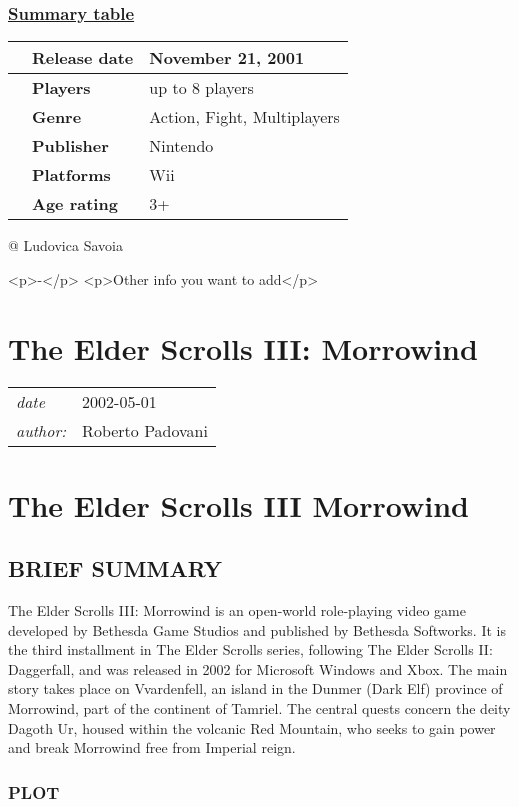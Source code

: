\documentclass[a4paper,10pt]{book}
\newcommand{\pageHeader}[4]{
    \section{#1}
    \vspace{-0.3cm}
    \begin{table}[h!]
     \begin{tabular}{ll}
        \hline
        \textit{date} & #2 \\
        \textit{author: } & #3\\
        \hline
     \end{tabular}
    \end{table}
    \vspace{-0.3cm}
}
\begin{document}
 \subsubsection{\underline{Summary table }}
 \begin{longtable}{p{1mm}|l|l|}\hline
 
 & \textbf{Release date } 
 & November 21, 2001 
 \\\hline
 
 & \textbf{Players } 
 & up to 8 players 
 \\\hline
 
 & \textbf{Genre } 
 & Action, Fight, Multiplayers 
 \\\hline
 
 & \textbf{Publisher } 
 & Nintendo 
 \\\hline
 
 & \textbf{Platforms } 
 & Wii 
 \\\hline
 
 & \textbf{Age rating } 
 & 3+ 
 \\\hline
 \end{longtable}
 
 @ Ludovica Savoia  
 
           <p>-</p>
           <p>Other info you want to add</p>
          
 
 \newpage\pageHeader{The Elder Scrolls III: Morrowind}{2002-05-01}{Roberto Padovani}{Third chapter of the Elder Scrolls}
 \section{ The Elder Scrolls III Morrowind }
 \subsection{BRIEF SUMMARY }
 
          The Elder Scrolls III: Morrowind is an open-world role-playing video game developed by Bethesda Game Studios and published by Bethesda Softworks. It is the third installment in The Elder Scrolls series, following The Elder Scrolls II: Daggerfall, and was released in 2002 for Microsoft Windows and Xbox. The main story takes place on Vvardenfell, an island in the Dunmer (Dark Elf) province of Morrowind, part of the continent of Tamriel. The central quests concern the deity Dagoth Ur, housed within the volcanic Red Mountain, who seeks to gain power and break Morrowind free from Imperial reign.
         
 
 \subsubsection{PLOT }
 
\end{document}
